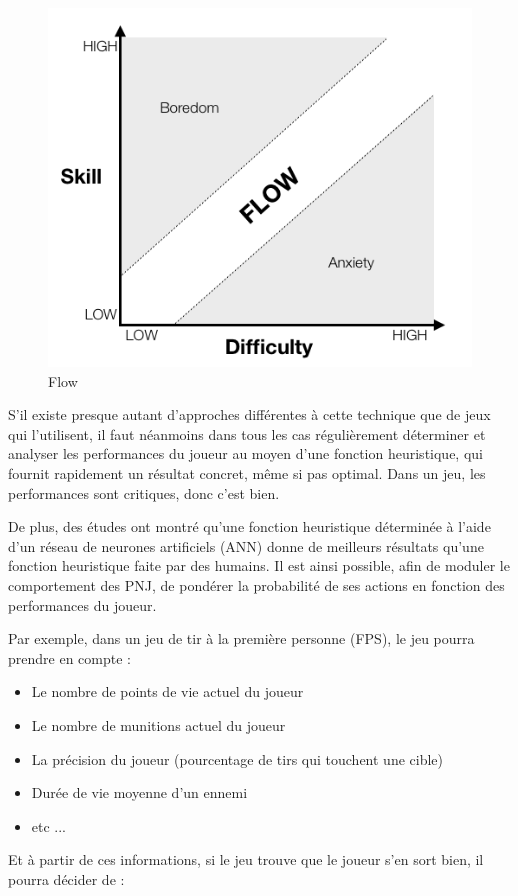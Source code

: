 \documentclass[a4paper, 12pt]{article} %
\begin{document}
\begin{figure}[!h]%
	\begin{center} 
		\includegraphics[width=0.60\columnwidth]{images/flow.png}%
		\caption{Flow}%
	\end{center}
\end{figure}

S’il existe presque autant d’approches différentes à cette technique que de jeux qui l’utilisent, il faut néanmoins dans tous les cas régulièrement déterminer et analyser les performances du joueur au moyen d’une fonction heuristique, qui fournit rapidement un résultat concret, même si pas optimal. Dans un jeu, les performances sont critiques, donc c’est bien. 

De plus, des études ont montré qu’une fonction heuristique déterminée à l’aide d’un réseau de neurones artificiels (ANN) donne de meilleurs résultats qu’une fonction heuristique faite par des humains.
Il est ainsi possible, afin de moduler le comportement des PNJ, de pondérer la probabilité de ses actions en fonction des performances du joueur.

Par exemple, dans un jeu de tir à la première personne (FPS), le jeu pourra prendre en compte :

\begin{itemize}
	\item Le nombre de points de vie actuel du joueur
	\item Le nombre de munitions actuel du joueur
	\item La précision du joueur (pourcentage de tirs qui touchent une cible)
	\item Durée de vie moyenne d’un ennemi
	\item etc ...
\end{itemize}

Et à partir de ces informations, si le jeu trouve que le joueur s’en sort bien, il pourra décider de :
\end{document}
